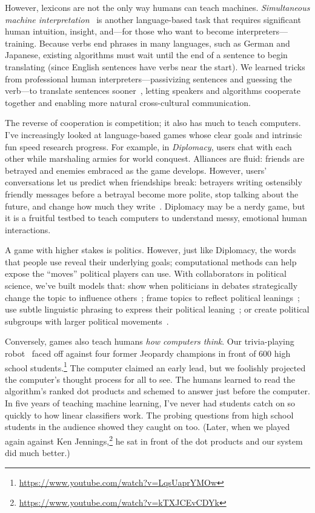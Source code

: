 \documentclass[11pt]{amsart}
\begin{document}
However, lexicons are not the only way humans can teach machines.
\emph{Simultaneous machine
  interpretation}~\cite{Grissom:He:Boyd-Graber:Morgan-2014} is another
language-based task that requires significant human intuition,
insight, and---for those who want to become
interpreters---training. Because verbs end phrases in many languages,
such as German and Japanese, existing algorithms must wait until the
end of a sentence to begin translating (since English sentences have
verbs near the start). We learned tricks from professional human
interpreters---passivizing sentences and guessing the verb---to
translate sentences sooner~\cite{He-15}, letting speakers and
algorithms cooperate together and enabling more natural cross-cultural
communication.

The reverse of cooperation is competition; it also has much to teach
computers. I've increasingly looked at language-based games whose clear goals
and intrinsic fun speed research progress.  For example, in \emph{Diplomacy},
users chat with each other while marshaling armies for world conquest.
Alliances are fluid: friends are betrayed and enemies embraced as the game
develops. However, users' conversations let us predict when friendships break:
betrayers writing ostensibly friendly messages before a betrayal become more
polite, stop talking about the future, and change how much they
write~\cite{niculae-15}.  Diplomacy may be a nerdy game, but it is a fruitful
testbed to teach computers to understand messy, emotional human interactions.

A game with higher stakes is politics.  However, just like Diplomacy, the words
that people use reveal their underlying goals; computational methods can help
expose the ``moves'' political players can use.  With collaborators in political
science, we've built models that: show when politicians in debates strategically
change the topic to influence others~\cite{nguyen-12,Nguyen-14b}; frame topics
to reflect political leanings~\cite{nguyen-13:shlda}; use subtle linguistic
phrasing to express their political leaning~\cite{iyyer-14a}; or create
political subgroups with larger political
movements~\cite{Nguyen:Boyd-Graber:Resnik:Miler-2015}.

Conversely, games also teach humans \emph{how computers think}.  Our
trivia-playing robot~\cite{boyd-graber-12,iyyer-14b,iyyer-15} faced off against
four former Jeopardy champions in front of 600 high school
students.\footnote{\url{https://www.youtube.com/watch?v=LqsUaprYMOw}} The
computer claimed an early lead, but we foolishly projected the computer's
thought process for all to see.  The humans learned to read the algorithm's
ranked dot products and schemed to answer just before the computer. In five
years of teaching machine learning, I've never had students catch on so quickly
to how linear classifiers work.  The probing questions from high school students
in the audience showed they caught on too.  (Later, when we played again against
Ken Jennings,\footnote{\url{https://www.youtube.com/watch?v=kTXJCEvCDYk}} he sat
in front of the dot products and our system did much better.)
\end{document}
